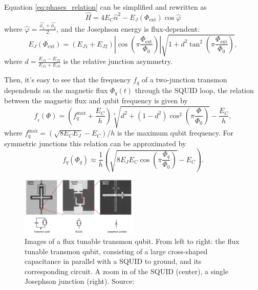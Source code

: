 Equation \ref{eq:phases_relation} can be simplified and rewritten as 
\begin{equation}\label{eq:tunable_transmon_hamiltonian}
    \hat{H} = 4E_C\hat{n}^2 - E_J(\Phi_{\text{ext}})\cos{\hat{\varphi}}
\end{equation}
where $\hat{\varphi} = \frac{\hat{\phi_1}+\hat{\phi_2}}{2}$, and the Josephson energy is flux-dependent: 
\begin{equation}\label{eq:EJ_tunable}
    E_J(\Phi_{\text{ext}}) = (E_{J1} + E_{J2}) \left| \cos \left( \pi \frac{\Phi_{\text{ext}}}{\Phi_0} \right) \right| \sqrt{1 + d^2 \tan^2 \left( \pi \frac{\Phi_{\text{ext}}}{\Phi_0} \right) },
\end{equation}
where $d = \frac{E_{J1}-E_{J2}}{E_{J1}+E_{J2}}$ is the relative junction asymmetry.

Then, it's easy to see that the frequency $f_q$ of a two-junction transmon dependends on the magnetic flux $\Phi_q(t)$ through the SQUID loop, the relation between the magnetic flux and qubit frequency is given by \cite{PhysRevApplied.20.024070}
\begin{equation}\label{eq:freqdepndenceonflux}
    f__q(\Phi) = \left( f_q^{\text{max}} + \frac{E_C}{h} \right) \sqrt[4]{d^2 + (1 - d^2) \cos^2 \left( \pi \frac{\Phi}{\Phi_0} \right)} - \frac{E_C}{h},
\end{equation}
where $f_q^{\text{max}} = (\sqrt{8E_C E_J}-E_C)/h$ is the maximum qubit frequency. For symmetric junctions this relation can be approximated by \cite{rol_time-domain_2020}
\begin{equation}\label{eq:freqdepndenceonflux_approx}
    f_q(\Phi_q) \approx \frac{1}{h} \left( \sqrt{8E_J E_C \cos\left(\pi \frac{\Phi_q}{\Phi_0} \right)} - E_C \right).    
\end{equation}

\begin{figure}[ht!]
    \centering
    \includegraphics[width=0.50\textwidth]{figures/png/FrequencyTunableTransmon.png}
    \caption{Images of a flux tunable transmon qubit. From left to right: the flux tunable transmon qubit, consisting of a large cross-shaped capacitance in parallel with a SQUID to ground, and its corresponding circuit. A zoom in of the SQUID (center), a single Josephson junction (right). Source: \cite{Roth_2023}}
    \label{fig:FrequencyTunableTransmon}
\end{figure}

